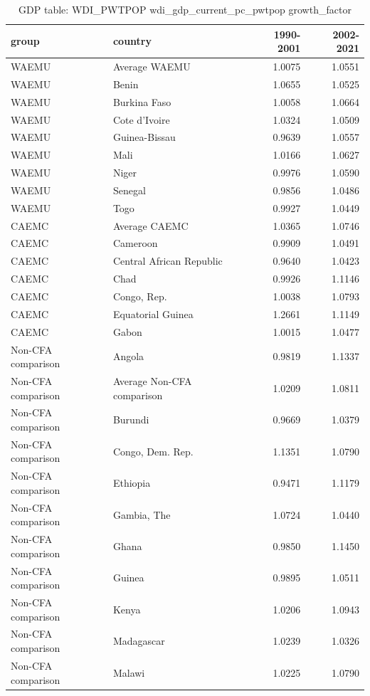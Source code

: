 \begin{table}

\caption{GDP table: WDI_PWTPOP wdi_gdp_current_pc_pwtpop growth_factor}
\centering
\begin{tabular}[t]{llrr}
\toprule
group & country & 1990-2001 & 2002-2021\\
\midrule
WAEMU & Average WAEMU & 1.0075 & 1.0551\\
WAEMU & Benin & 1.0655 & 1.0525\\
WAEMU & Burkina Faso & 1.0058 & 1.0664\\
WAEMU & Cote d'Ivoire & 1.0324 & 1.0509\\
WAEMU & Guinea-Bissau & 0.9639 & 1.0557\\
\addlinespace
WAEMU & Mali & 1.0166 & 1.0627\\
WAEMU & Niger & 0.9976 & 1.0590\\
WAEMU & Senegal & 0.9856 & 1.0486\\
WAEMU & Togo & 0.9927 & 1.0449\\
CAEMC & Average CAEMC & 1.0365 & 1.0746\\
\addlinespace
CAEMC & Cameroon & 0.9909 & 1.0491\\
CAEMC & Central African Republic & 0.9640 & 1.0423\\
CAEMC & Chad & 0.9926 & 1.1146\\
CAEMC & Congo, Rep. & 1.0038 & 1.0793\\
CAEMC & Equatorial Guinea & 1.2661 & 1.1149\\
\addlinespace
CAEMC & Gabon & 1.0015 & 1.0477\\
Non-CFA comparison & Angola & 0.9819 & 1.1337\\
Non-CFA comparison & Average Non-CFA comparison & 1.0209 & 1.0811\\
Non-CFA comparison & Burundi & 0.9669 & 1.0379\\
Non-CFA comparison & Congo, Dem. Rep. & 1.1351 & 1.0790\\
\addlinespace
Non-CFA comparison & Ethiopia & 0.9471 & 1.1179\\
Non-CFA comparison & Gambia, The & 1.0724 & 1.0440\\
Non-CFA comparison & Ghana & 0.9850 & 1.1450\\
Non-CFA comparison & Guinea & 0.9895 & 1.0511\\
Non-CFA comparison & Kenya & 1.0206 & 1.0943\\
\addlinespace
Non-CFA comparison & Madagascar & 1.0239 & 1.0326\\
Non-CFA comparison & Malawi & 1.0225 & 1.0790\\

\end{tabular}
\end{table}
